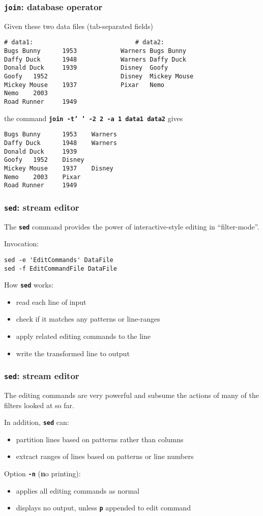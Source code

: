 \begin{frame}
\frametitle{\textbf{\tt{join}}: database operator}
Given these two data files (tab-separated fields)
\begin{verbatim}
# data1:                            # data2:
Bugs Bunny      1953            Warners Bugs Bunny
Daffy Duck      1948            Warners Daffy Duck
Donald Duck     1939            Disney  Goofy
Goofy   1952                    Disney  Mickey Mouse
Mickey Mouse    1937            Pixar   Nemo
Nemo    2003
Road Runner     1949
\end{verbatim}
the command \textbf{\tt{join -t'   ' -2 2 -a 1 data1 data2}} gives
\begin{verbatim}
Bugs Bunny      1953    Warners
Daffy Duck      1948    Warners
Donald Duck     1939
Goofy   1952    Disney
Mickey Mouse    1937    Disney
Nemo    2003    Pixar
Road Runner     1949
\end{verbatim}
\end{frame}

\begin{frame}[fragile]
\frametitle{\textbf{\tt{sed}}: stream editor}
The \textbf{\tt{sed}} command provides the power of interactive-style
editing in ``filter-mode''.

Invocation:
\begin{verbatim}
sed -e 'EditCommands' DataFile
sed -f EditCommandFile DataFile
\end{verbatim}

How \textbf{\tt{sed}} works:
\begin{itemize}
\item  read each line of input
\item  check if it matches any patterns or line-ranges
\item  apply related editing commands to the line
\item  write the transformed line to output
\end{itemize}
\end{frame}

\begin{frame}
\frametitle{\textbf{\tt{sed}}: stream editor}
The editing commands are very powerful and subsume the actions of
many of the filters looked at so far.

In addition, \textbf{\tt{sed}} can:
\begin{itemize}
\item  partition lines based on patterns rather than columns
\item  extract ranges of lines based on patterns or line numbers
\end{itemize}
Option \textbf{\tt{-n}} ({\bf{n}}o printing):
\begin{itemize}
\item  applies all editing commands as normal
\item  displays no output, unless \textbf{\tt{p}} appended to edit command
\end{itemize}
\end{frame}

